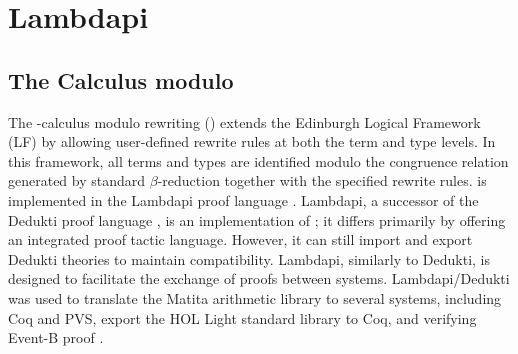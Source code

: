 \chapter{Lambdapi}\label{ch:intro-lambdapi}

\section{The \texorpdfstring{\lp}-Calculus modulo}

The \lp-calculus modulo rewriting (\lpm)  extends the Edinburgh Logical Framework (LF) \cite{lf} by allowing user-defined rewrite rules at both the term and type levels.
In this framework, all terms and types are identified modulo the congruence relation generated by standard $\beta$-reduction together with the specified rewrite rules.
{\lpm} is implemented in the Lambdapi proof language \cite{lambdapi}. Lambdapi, a successor of the Dedukti proof language \cite{Dedukti-ref, Dedukti-ref2}, is an implementation of {\lpm}; it differs primarily by offering an integrated proof tactic language.
However, it can still import and export Dedukti theories to maintain compatibility. Lambdapi, similarly to Dedukti, is designed to facilitate the exchange of proofs between systems.
Lambdapi/Dedukti was used to translate \cite{thire:tel-03224039} the Matita arithmetic library to several systems, including Coq and PVS, export \cite{blanqui:hal-04613926} the HOL Light standard library to Coq,
and verifying Event-B proof \cite{eventb2lp}.


